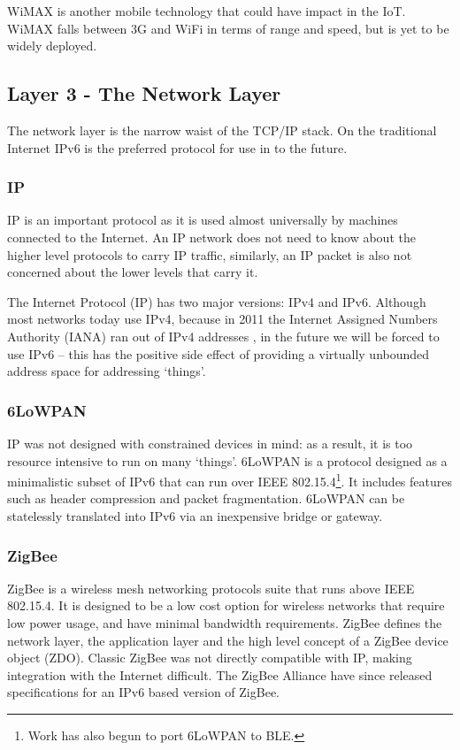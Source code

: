 \documentclass[10pt,journal,compsoc]{IEEEtran}
\begin{document}
WiMAX is another mobile technology that could have impact in the IoT. WiMAX
falls between 3G and WiFi in terms of range and speed, but is yet to be widely
deployed.  

\subsection{Layer 3 - The Network Layer}
The network layer is the narrow waist of the TCP/IP stack. On the traditional
Internet IPv6 is the preferred protocol for use in to the future.

\subsubsection{IP}
IP is an important protocol as it is used almost universally by machines
connected to the Internet. An IP network does not need to know about the higher
level protocols to carry IP traffic, similarly, an IP packet is also not
concerned about the lower levels that carry it. 

The Internet Protocol (IP) has two major versions: IPv4 and IPv6. Although most
networks today use IPv4, because in 2011 the Internet Assigned Numbers Authority
(IANA) ran out of IPv4 addresses \cite{Potaroo}, in the future we will be
forced to use IPv6 -- this has the positive side effect of providing a
virtually unbounded address space for addressing `things'. 

\subsubsection{6LoWPAN}
IP was not designed with constrained devices in mind: as a result, it is too
resource intensive to run on many `things'. 6LoWPAN is a protocol designed as a
minimalistic subset of IPv6 that can run over IEEE 802.15.4\footnote{Work has
also begun to port 6LoWPAN to BLE.}. It includes features such as header
compression and packet fragmentation. 6LoWPAN can be statelessly translated
into IPv6 via an inexpensive bridge or gateway. 

\subsubsection{ZigBee}
ZigBee is a wireless mesh networking protocols suite that runs above IEEE
802.15.4. It is designed to be a low cost option for wireless networks that
require low power usage, and have minimal bandwidth requirements. ZigBee
defines the network layer, the application layer and the high level concept of
a ZigBee device object (ZDO).  Classic ZigBee was not directly compatible with
IP, making integration with the Internet difficult. The ZigBee Alliance have
since released specifications for an IPv6 based version of ZigBee.
\end{document}
